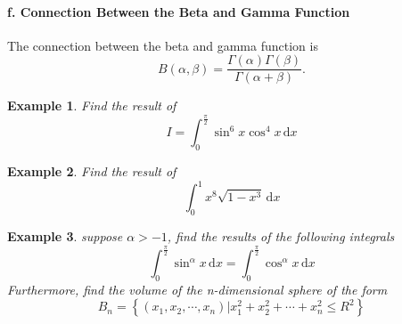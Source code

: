 \documentclass[a4paper,12pt]{article}
\newtheorem{example}{Example}             %
\begin{document}
\begin{CJK}{UTF8}{gbsn}
     \paragraph{\rm \textbf{f. Connection Between the Beta and Gamma Function}}
     The connection between the beta and gamma function is 
     \begin{equation}
         B\left(\alpha, \beta\right) = \frac{\Gamma(\alpha)\Gamma(\beta)}{\Gamma(\alpha + \beta)}.
     \end{equation}

     \begin{example}
         Find the result of 
         \[
             I = \int_0^{\frac{\pi}{2}}\sin^6x\cos^4x\, \mathrm{d}x
             \]
     \end{example}

     \begin{example}
         Find the result of 
         \[
             \int_0^1x^8 \sqrt{1-x^3}\, \mathrm{d}x
             \]
     \end{example}

     \begin{example}
         suppose $\alpha > -1$, find the results of the following integrals
         \[
             \int_0^{\frac{\pi}{2}}\sin^{\alpha}x\, \mathrm{d}x  = 
             \int_0^{\frac{\pi}{2}}\cos^{\alpha}x\, \mathrm{d}x 
             \]
         Furthermore, find the volume of the n-dimensional sphere of the form
         \[
             B_n = \left\{(x_1, x_2, \cdots ,x_n) \vert x_1^2+x_2^2+\cdots+x_n^2 \le R^2\right\}
             \]
     \end{example}
\end{CJK}
\end{document}
